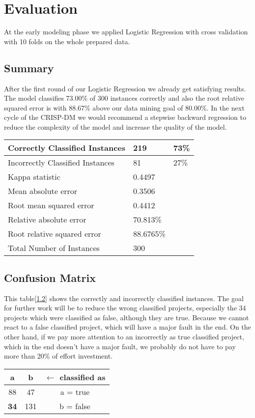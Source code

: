 \chapter{Evaluation}
At the early modeling phase we applied Logistic Regression with cross validation with 10 folds on the whole prepared data.
 
\section{Summary}
After the first round of our Logistic Regression we already get satisfying results. The model classifies 73.00\% of 300 instances correctly and also the root relative squared error is with 88.67\% above our data mining goal of 80.00\%. In the next cycle of the CRISP-DM we would recommend a stepwise backward regression to reduce the complexity of the model and increase the quality of the model.
\begin{table}[H]
\centering
\begin{tabular}{ | l | l | l | }
  \hline
	Correctly Classified Instances & 219 & 73\% \\ \hline
	Incorrectly Classified Instances & 81 & 27\% \\ \hline
	Kappa statistic & 0.4497 & \\ \hline
	Mean absolute error & 0.3506 & \\ \hline
	Root mean squared error & 0.4412 & \\ \hline
	Relative absolute error & 70.813\% & \\ \hline
	Root relative squared error & 88.6765\% & \\ \hline
	Total Number of Instances & 300 & \\ \hline
\end{tabular}
\label{table:summary}
\end{table}

\section{Confusion Matrix}
This table[\ref{table:matrix}] shows the correctly and incorrectly classified instances. The goal for further work will be to reduce the wrong classified projects, especially the 34 projects which were classified as false, although they are true. Because we cannot react to a false classified project, which will have a major fault in the end. On the other hand, if we pay more attention to an incorrectly as true classified project, which in the end doesn't have a major fault, we probably do not have to pay more than 20\% of effort investment.
\begin{table}[H]
\centering
\begin{tabular}{ | c | c | c | }
  \hline
	a & b & $\leftarrow$ classified as \\ \hline
  88 & 47 & a = true \\ \hline
  \textbf{34} & 131 & b = false \\ \hline
\end{tabular}
\label{table:matrix}
\end{table}

